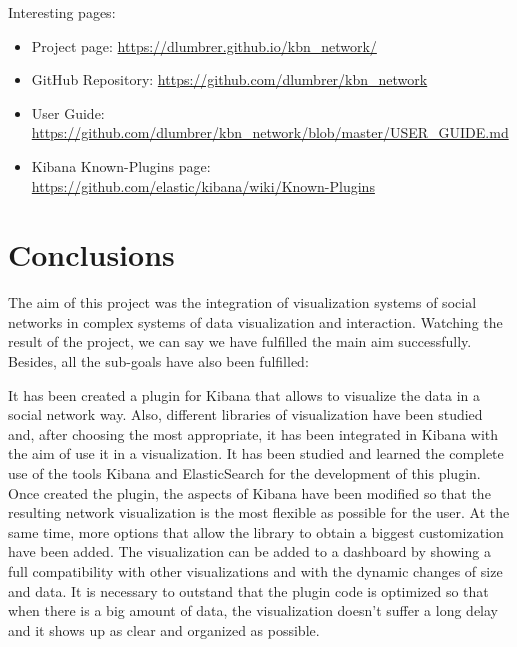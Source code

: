 \documentclass[a4paper, 12pt]{book}
\begin{document}
Interesting pages:

\begin{itemize}
\item Project page: \url{https://dlumbrer.github.io/kbn_network/}
\item GitHub Repository: \url{https://github.com/dlumbrer/kbn_network}
\item User Guide: \url{https://github.com/dlumbrer/kbn_network/blob/master/USER_GUIDE.md}
\item Kibana Known-Plugins page: \url{https://github.com/elastic/kibana/wiki/Known-Plugins}
\end{itemize}


\cleardoublepage
\chapter{Conclusions}
\label{chap:conclusions}
The aim of this project was the integration of visualization systems of social networks in complex systems of data visualization and interaction. Watching the result of the project, we can say we have fulfilled the main aim successfully. Besides, all the sub-goals have also been fulfilled:

It has been created a plugin for Kibana that allows to visualize the data in a social network way. Also, different libraries of visualization have been studied and, after choosing the most appropriate, it has been integrated in Kibana with the aim of use it in a visualization. It has been studied and learned the complete use of the tools Kibana and ElasticSearch for the development of this plugin. Once created the plugin, the aspects of Kibana have been modified so that the resulting network visualization is the most flexible as possible for the user. At the same time, more options that allow the library to obtain a biggest customization have been added. The visualization can be added to a dashboard by showing a full compatibility with other visualizations and with the dynamic changes of size and data. It is necessary to outstand that the plugin code is optimized so that when there is a big amount of data, the visualization doesn’t suffer a long delay and it shows up as clear and organized as possible.\\
\end{document}
